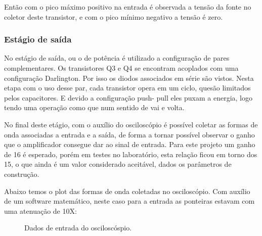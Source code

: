 \documentclass[a4paper,12pt,oneside,openany,table,xcdraw]{article}
\begin{document}
Então com o pico máximo positivo na entrada é observada a tensão da fonte no coletor deste transistor, e com o pico mínimo negativo a tensão é zero. 


\subsubsection{Estágio de saída}
No estágio de saída, ou o de potência é utilizado a configuração de pares complementares. Os transistores Q3 e Q4 se encontram acoplados com uma configuração Darlington. Por isso os diodos associados em série são vistos.
Nesta etapa com o uso desse par, cada transistor opera em um ciclo, quesão limitados pelos capacitores. E devido a configuração push- pull eles puxam a energia, logo tendo uma operação como que num sentido de vai e volta.

No final deste etágio, com o auxílio do osciloscópio é possível coletar as formas de onda associadas a entrada e a saída, de forma a tornar possível observar o ganho que o amplificador consegue dar ao sinal de entrada. Para este projeto um ganho de 16 é esperado, porém em testes no laboratório, esta relação ficou em torno dos 15, o que ainda é um valor considerado aceitável, dados os parâmetros de construção.

Abaixo temos o plot das formas de onda coletadas no osciloscópio. Com auxílio de um software matemático, neste caso para a entrada as ponteiras estavam com uma atenuação de 10X:

\begin{figure}[H]
\hfill
{}
\caption{Dados de entrada do osciloscóspio.}
\label{ampsuperiorlayout}
\end{figure}
\end{document}
